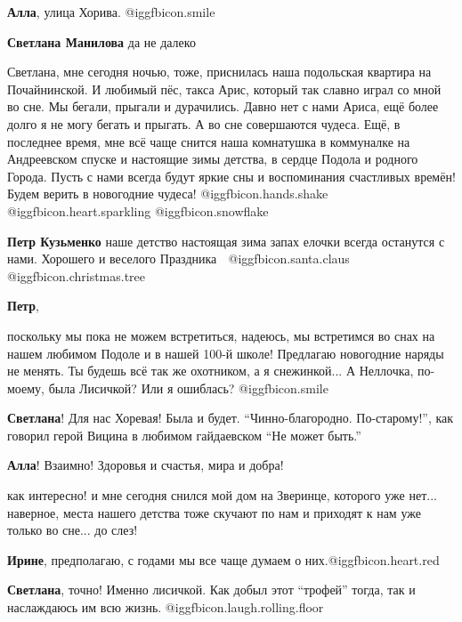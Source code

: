 \begin{itemize}
\begin{itemize}
\begin{itemize}
\textbf{Алла}, улица Хорива. @igg{fbicon.smile} 

\textbf{Светлана Манилова} да не далеко


Светлана, мне сегодня ночью, тоже, приснилась наша подольская квартира на
Почайнинской. И любимый пёс, такса Арис, который так славно играл со мной во
сне. Мы бегали, прыгали и дурачились. Давно нет с нами Ариса, ещё более долго я
не могу бегать и прыгать. А во сне совершаются чудеса. Ещё, в последнее время,
мне всё чаще снится наша комнатушка в коммуналке на Андреевском спуске и
настоящие зимы детства, в сердце Подола и родного Города. Пусть с нами всегда
будут яркие сны и воспоминания счастливых времён! Будем верить в новогодние
чудеса! @igg{fbicon.hands.shake}  @igg{fbicon.heart.sparkling} @igg{fbicon.snowflake}

\textbf{Петр Кузьменко} наше детство настоящая зима запах елочки всегда останутся с нами. Хорошего и веселого Праздника 🤶 @igg{fbicon.santa.claus}  @igg{fbicon.christmas.tree} 

\textbf{Петр}, 

поскольку мы пока не можем встретиться, надеюсь, мы встретимся во снах на нашем
любимом Подоле и в нашей 100-й школе! Предлагаю новогодние наряды не менять. Ты
будешь всё так же охотником, а я снежинкой... А Неллочка, по- моему, была
Лисичкой? Или я ошиблась? @igg{fbicon.smile} 


\textbf{Светлана}! Для нас Хоревая! Была и будет. \enquote{Чинно-благородно. По-старому!}, как говорил герой Вицина в любимом гайдаевском \enquote{Не может быть.}

\textbf{Алла}! Взаимно! Здоровья и счастья, мира и добра!


как интересно! и мне сегодня снился мой дом на Зверинце, которого уже
нет... наверное, места нашего детства тоже скучают по нам и приходят к нам уже
только во сне... до слез!


\textbf{Ирине}, предполагаю, с годами мы все чаще думаем о них.@igg{fbicon.heart.red}
\end{itemize} %

\textbf{Светлана}, точно! Именно лисичкой. Как добыл этот \enquote{трофей} тогда, так и наслаждаюсь им всю жизнь. @igg{fbicon.laugh.rolling.floor} 
\end{itemize} %


\end{itemize}
